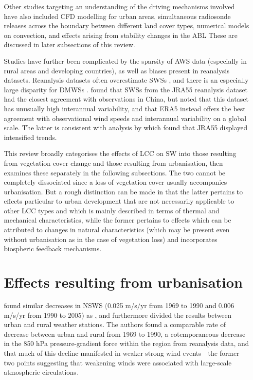Other studies targeting an understanding of the driving mechanisms involved have also included \ac{CFD} modelling for urban areas, simultaneous radiosonde releases across the boundary between different land cover types, numerical models on convection, and effects arising from stability changes in the \ac{ABL} These are discussed in later subsections of this review.

Studies have further been complicated by the sparsity of \ac{AWS} data (especially in rural areas and developing countries), as well as biases present in reanalysis datasets. Reanalysis datasets often overestimate \acp{SWS} \citep{fan2021}, and there is an especially large disparity for \acp{DMWS} \citep{zhang2020, zhang2022}. \citet{zhang2019} found that \acp{SWS} from the \ac{JRA55} reanalysis dataset had the closest agreement with observations in China, but \citet{ramon2019} noted that this dataset has unusually high interannual variability, and that \ac{ERA5} instead offers the best agreement with observational wind speeds and interannual variability on a global scale. The latter is consistent with analysis by \citet{torralba2017} which found that \ac{JRA55} displayed intensified trends.

This review broadly categorises the effects of \ac{LCC} on \ac{SW} into those resulting from vegetation cover change and those resulting from urbanisation, then examines these separately in the following subsections. The two cannot be completely dissociated since a loss of vegetation cover usually accompanies urbanisation. But a rough distinction can be made in that the latter pertains to effects particular to urban development that are not necessarily applicable to other \ac{LCC} types and which is mainly described in terms of thermal and mechanical characteristics, while the former pertains to effects which can be attributed to changes in natural characteristics (which may be present even without urbanisation as in the case of vegetation loss) and incorporates biospheric feedback mechanisms.

\section{Effects resulting from urbanisation}

\citet{guo2011} found similar decreases in \ac{NSWS} (0.025 m/s/yr from 1969 to 1990 and 0.006 m/s/yr from 1990 to 2005) as \citet{li2008}, and furthermore divided the results between urban and rural weather stations. The authors found a comparable rate of decrease between urban and rural from 1969 to 1990, a cotemporaneous decrease in the 850 hPa pressure-gradient force within the region from reanalysis data, and that much of this decline manifested in weaker strong wind events - the former two points suggesting that weakening winds were associated with large-scale atmospheric circulations.

